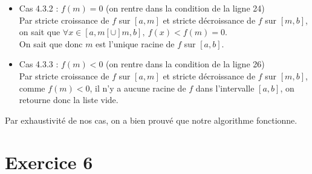 \documentclass[a4paper, 12pt]{article}
\begin{document}
\begin{itemize}
\begin{itemize}
\begin{itemize}
            \item Cas 4.3.2 : \( f(m) = 0 \) \quad (on rentre dans la condition de la ligne 24) \\
Par stricte croissance de \( f \) sur \( [a, m] \) et stricte décroissance de \( f \) sur \( [m, b] \), on sait que \( \forall x \in [a, m[ \cup ]m, b],~ f(x) < f(m) = 0 \). \\
On sait que donc \( m \) est l'unique racine de \( f \) sur \( [a, b] \).
            
            \item Cas 4.3.3 : \( f(m) < 0 \) \quad (on rentre dans la condition de la ligne 26) \\
Par stricte croissance de \( f \) sur \( [a, m] \) et stricte décroissance de \( f \) sur \( [m, b] \), comme \( f(m) < 0 \), il n'y a aucune racine de \( f \) dans l'intervalle \( [a, b] \), on retourne donc la liste vide.
            
        \end{itemize}
    
    \end{itemize}

\end{itemize}
Par exhaustivité de nos cas, on a bien prouvé que notre algorithme fonctionne.

\newpage

\section{Exercice 6}
\end{document}
